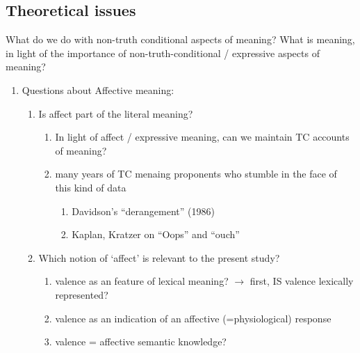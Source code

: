 \documentclass[12pt,letterpaper,table,svgnames,dvipsnames]{article}
\begin{document}
\subsection{Theoretical issues}

What do we do with non-truth conditional aspects of meaning?
What is meaning, in light of the importance of non-truth-conditional / expressive aspects of meaning?


\begin{enumerate}[noitemsep]
    
    \item Questions about Affective meaning:
         \begin{enumerate}[noitemsep]

            \item Is affect part of the literal meaning?
                \begin{enumerate}[noitemsep]%
                \item In light of affect / expressive meaning, can we maintain TC accounts of meaning?

                \item many years of TC menaing proponents who stumble in the face of this kind of data 
                        \begin{enumerate}[noitemsep]%
                            \item Davidson's ``derangement'' (1986)%
                            \item Kaplan, Kratzer on ``Oops'' and ``ouch''%
                        \end{enumerate}
            \end{enumerate}
            
            \item Which notion of `affect' is relevant to the present study?
                \begin{enumerate}[noitemsep]
                    \item valence as an feature of lexical meaning?
                        $\rightarrow$ first, IS valence lexically represented?
                    \item valence as an indication of an affective (=physiological) response 
                    
                    \item valence = affective semantic knowledge?
                \end{enumerate}
            

\end{enumerate}
\end{enumerate}
\end{document}
